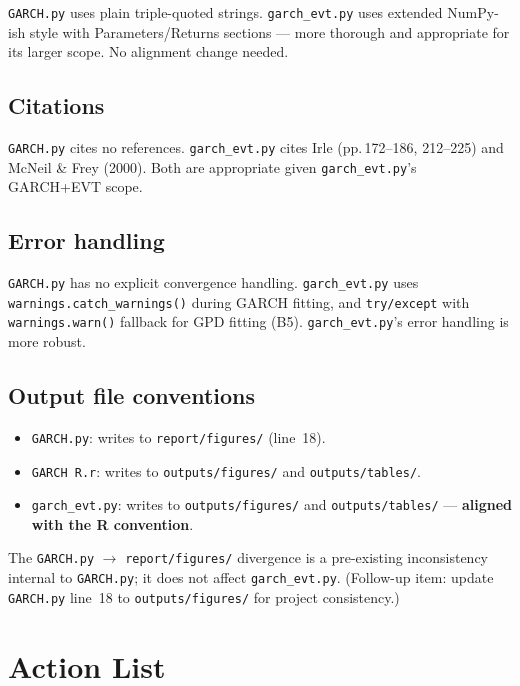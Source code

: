 \documentclass[11pt,a4paper]{article}
\newcommand{\code}[1]{\texttt{#1}}
\begin{document}
\code{GARCH.py} uses plain triple-quoted strings. \code{garch\_evt.py} uses
extended NumPy-ish style with Parameters/Returns sections --- more thorough
and appropriate for its larger scope. No alignment change needed.

\subsection{Citations}

\code{GARCH.py} cites no references. \code{garch\_evt.py} cites Irle
(pp.\,172--186, 212--225) and McNeil \& Frey (2000). Both are appropriate
given \code{garch\_evt.py}'s GARCH+EVT scope.

\subsection{Error handling}

\code{GARCH.py} has no explicit convergence handling. \code{garch\_evt.py}
uses \code{warnings.catch\_warnings()} during GARCH fitting, and
\code{try/except} with \code{warnings.warn()} fallback for GPD fitting
(B5). \code{garch\_evt.py}'s error handling is more robust.

\subsection{Output file conventions}

\begin{itemize}
  \item \code{GARCH.py}: writes to \code{report/figures/} (line~18).
  \item \code{GARCH R.r}: writes to \code{outputs/figures/} and
    \code{outputs/tables/}.
  \item \code{garch\_evt.py}: writes to \code{outputs/figures/} and
    \code{outputs/tables/} --- \textbf{aligned with the R convention}.
\end{itemize}

The \code{GARCH.py} $\to$ \code{report/figures/} divergence is a pre-existing
inconsistency internal to \code{GARCH.py}; it does not affect
\code{garch\_evt.py}. (Follow-up item: update \code{GARCH.py} line~18 to
\code{outputs/figures/} for project consistency.)

\section{Action List}\label{sec:actions}
\end{document}
